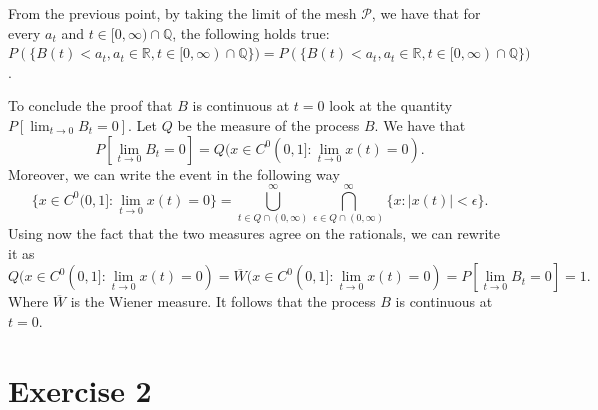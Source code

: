 \documentclass[a4paper,12pt]{article} %
\newtheorem{proposition}{Proposition}
\begin{document}
From the previous point, by taking the limit of the mesh \(\mathcal{P}\), we have that for every \(a_t\) and \(t \in  [0, \infty ) \cap \mathbb{Q}\), the following holds true: \(P(\{ B(t) <a_t , a_t \in  \mathbb{R},t \in  [0, \infty ) \cap \mathbb{Q} \} ) = P(\{ B(t) <a_t , a_t \in  \mathbb{R},t \in  [0, \infty ) \cap \mathbb{Q} \} )\).

To conclude the proof that \(B\) is continuous at \(t=0\) look at the quantity \(P[\lim_{t \to 0} B_t=0] \).
Let \(Q\) be the measure of the process \(B\). We have that
\begin{equation}
    P[\lim_{t \to 0} B_t=0] = Q(x \in  C^0(0,1]: \lim_{t \to 0}x(t)=0 ).
\end{equation}
Moreover, we can write the event in the following way
\begin{equation}
    \{ x \in  C^0(0,1]: \lim_{t \to 0}x(t)=0  \}  = \bigcup_{t\in Q \cap (0, \infty )}^{\infty} \bigcap_{\epsilon \in  Q \cap (0,\infty )}^{\infty} \{ x: |x(t)| < \epsilon \}.
\end{equation}
Using now the fact that the two measures agree on the rationals, we can rewrite it as
\begin{equation}
    Q(x \in  C^0(0,1]: \lim_{t \to 0}x(t)=0 ) = \overline{W} (x \in  C^0(0,1]: \lim_{t \to 0}x(t)=0 )= P[\lim_{t \to 0} B_t=0]=1.
\end{equation}
Where \(\overline{W}\) is the Wiener measure. It follows that the process \(B\) is continuous at \(t=0\).



\section{Exercise 2}
\end{document}
